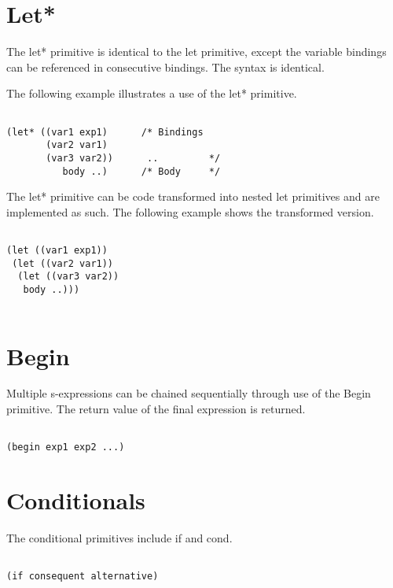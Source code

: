 \documentclass{article}
\begin{document}
\section{Let*}

The let* primitive is identical to the let primitive, except the variable bindings can be referenced in consecutive bindings. The syntax is identical.

The following example illustrates a use of the let* primitive. 

\begin{verbatim}

(let* ((var1 exp1)      /* Bindings
       (var2 var1)     
       (var3 var2))      ..         */
          body ..)      /* Body     */   

\end{verbatim}

The let* primitive can be code transformed into nested let primitives and are implemented as such. The following example shows the transformed version.

\begin{verbatim}

(let ((var1 exp1))
 (let ((var2 var1))
  (let ((var3 var2))
   body ..))) 
 
\end{verbatim}

\section{Begin}

Multiple s-expressions can be chained sequentially through use of the Begin primitive. The return value of the final expression is returned. 

\begin{verbatim}

(begin exp1 exp2 ...) 

\end{verbatim}

\section{Conditionals}

The conditional primitives include if and cond.

\begin{verbatim}

(if consequent alternative)

\end{verbatim}
\end{document}
